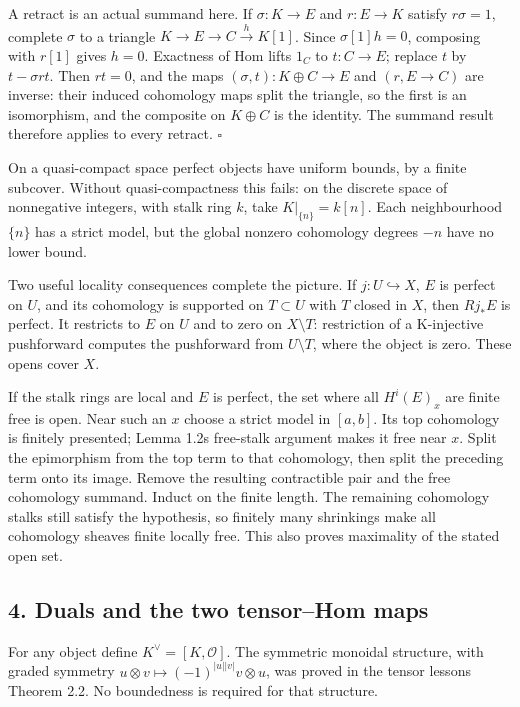 \documentclass[
  english,
  11pt,
  a4paper,
]{article}
\begin{document}
A retract is an actual summand here. If \(\sigma:K\to E\) and
\(r:E\to K\) satisfy \(r\sigma=1\), complete \(\sigma\) to a triangle
\(K\to E\to C\xrightarrow{h}K[1]\). Since \(\sigma[1]h=0\), composing
with \(r[1]\) gives \(h=0\). Exactness of Hom lifts \(1_C\) to
\(t:C\to E\); replace \(t\) by \(t-\sigma rt\). Then \(rt=0\), and the
maps \((\sigma,t):K\oplus C\to E\) and \((r,E\to C)\) are inverse: their
induced cohomology maps split the triangle, so the first is an
isomorphism, and the composite on \(K\oplus C\) is the identity. The
summand result therefore applies to every retract. \(\square\)

On a quasi-compact space perfect objects have uniform bounds, by a
finite subcover. Without quasi-compactness this fails: on the discrete
space of nonnegative integers, with stalk ring \(k\), take
\(K|_{\{n\}}=k[n]\). Each neighbourhood \(\{n\}\) has a strict model,
but the global nonzero cohomology degrees \(-n\) have no lower bound.

Two useful locality consequences complete the picture. If
\(j:U\hookrightarrow X\), \(E\) is perfect on \(U\), and its cohomology
is supported on \(T\subset U\) with \(T\) closed in \(X\), then
\(Rj_*E\) is perfect. It restricts to \(E\) on \(U\) and to zero on
\(X\setminus T\): restriction of a K-injective pushforward computes the
pushforward from \(U\setminus T\), where the object is zero. These opens
cover \(X\).

If the stalk rings are local and \(E\) is perfect, the set where all
\(H^i(E)_x\) are finite free is open. Near such an \(x\) choose a strict
model in \([a,b]\). Its top cohomology is finitely presented; Lemma
1.2\textquotesingle s free-stalk argument makes it free near \(x\).
Split the epimorphism from the top term to that cohomology, then split
the preceding term onto its image. Remove the resulting contractible
pair and the free cohomology summand. Induct on the finite length. The
remaining cohomology stalks still satisfy the hypothesis, so finitely
many shrinkings make all cohomology sheaves finite locally free. This
also proves maximality of the stated open set.

\subsection{4. Duals and the two tensor--Hom
maps}\label{perfect-complexes-and-duals--4-duals-and-the-two-tensor-hom-maps}

For any object define \(K^\vee=[K,\mathcal O]\). The symmetric monoidal
structure, with graded symmetry
\(u\otimes v\mapsto(-1)^{|u||v|}v\otimes u\), was proved in the tensor
lesson\textquotesingle s Theorem 2.2. No boundedness is required for
that structure.
\end{document}
